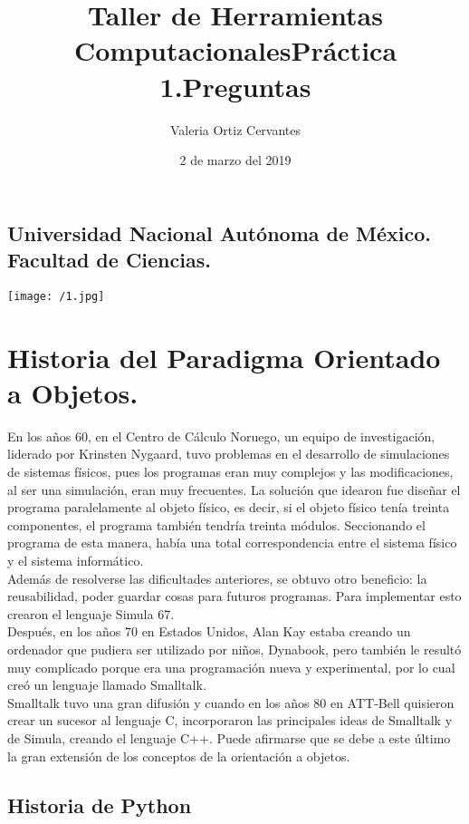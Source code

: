 \documentclass{article}
\title{\Huge Taller de Herramientas Computacionales}
\author{\huge Valeria Ortiz Cervantes}
\date{\LARGE 2 de marzo del 2019}
\begin{document}
\maketitle
\begin{center}
	\subsection*{\LARGE Universidad Nacional Autónoma de México.\\Facultad de Ciencias.\\}
	\texttt{[image: /1.jpg]}
\end{center}
\newpage
\begin{center}
	\title{\LARGE Práctica 1.Preguntas}
\end{center}
\section*{Historia del Paradigma Orientado a Objetos.}
En los años 60, en el Centro de Cálculo Noruego, un equipo de investigación, liderado por Krinsten Nygaard, tuvo problemas en el desarrollo de simulaciones de sistemas físicos, pues los programas eran muy complejos y las modificaciones, al ser una simulación, eran muy frecuentes. La solución que idearon fue diseñar el programa paralelamente al objeto físico, es decir, si el objeto físico tenía treinta componentes, el programa también tendría treinta módulos. Seccionando el programa de esta manera, había una total correspondencia entre el sistema físico y el sistema informático.\\Además de resolverse las dificultades anteriores, se obtuvo otro beneficio: la reusabilidad, poder guardar cosas para futuros programas. Para implementar esto crearon el lenguaje Simula 67.\\Después, en los años 70 en Estados Unidos, Alan Kay estaba creando un ordenador que pudiera ser utilizado por niños, Dynabook, pero también le resultó muy complicado porque era una programación nueva y experimental, por lo cual creó un lenguaje llamado Smalltalk.\\Smalltalk tuvo una gran difusión y cuando en los años 80 en ATT-Bell quisieron crear un sucesor al lenguaje C, incorporaron las principales ideas de Smalltalk y de Simula, creando el lenguaje C++. Puede afirmarse que se debe a este último la gran extensión de los conceptos de la orientación a objetos.
\begin{center}
	\section*{Historia de Python}
\end{center}
\end{document}
